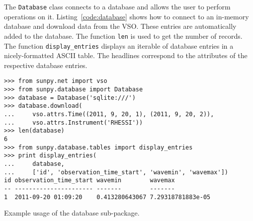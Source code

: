 The \texttt{Database} class connects to a database and allows the user to 
perform operations on it. Listing~\ref{code:database} shows how to connect
to an in-memory database and download data from the \textsc{VSO}. These entries are
automatically added to the database. The function \texttt{len} is used to get the number of
records. The function \texttt{display\_entries} displays an iterable of 
database entries in a nicely-formatted \textsc{ASCII} table. The headlines 
correspond to the attributes of the respective database entries.

\begin{listing}[H]
\begin{verbatim}
>>> from sunpy.net import vso
>>> from sunpy.database import Database
>>> database = Database('sqlite:///')
>>> database.download(
...     vso.attrs.Time((2011, 9, 20, 1), (2011, 9, 20, 2)),
...     vso.attrs.Instrument('RHESSI'))
>>> len(database)
6
>>> from sunpy.database.tables import display_entries
>>> print display_entries(
...     database,
...     ['id', 'observation_time_start', 'wavemin', 'wavemax'])
id observation_time_start wavemin        wavemax    
-- ---------------------- -------        -------    
1  2011-09-20 01:09:20    0.413280643067 7.29318781883e-05

\end{verbatim}
\caption{Example usage of the database sub-package.}
\label{code:database}
\end{listing}
